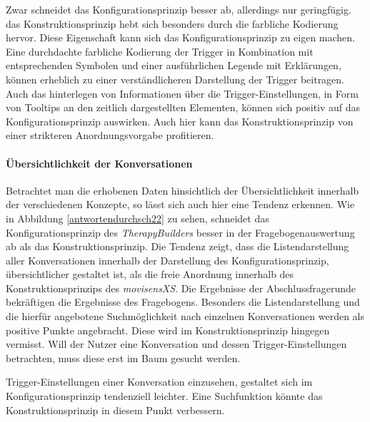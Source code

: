 Zwar schneidet das Konfigurationsprinzip besser ab, allerdings nur geringfügig. das Konstruktionsprinzip hebt sich besonders durch die farbliche Kodierung hervor. Diese Eigenschaft kann sich das Konfigurationsprinzip zu eigen machen. Eine durchdachte farbliche Kodierung der Trigger in Kombination mit entsprechenden Symbolen und einer ausführlichen Legende mit Erklärungen, können erheblich zu einer verständlicheren Darstellung der Trigger beitragen. Auch das hinterlegen von Informationen über die Trigger-Einstellungen, in Form von Tooltips an den zeitlich dargestellten Elementen, können sich positiv auf das Konfigurationsprinzip auswirken. Auch hier kann das Konstruktionsprinzip von einer strikteren Anordnungsvorgabe profitieren. 

\paragraph{Übersichtlichkeit der Konversationen}
Betrachtet man die erhobenen Daten hinsichtlich der Übersichtlichkeit innerhalb der verschiedenen Konzepte, so lässt sich auch hier eine Tendenz erkennen. Wie in Abbildung \ref{antwortendurchsch22} zu sehen, schneidet das Konfigurationsprinzip des \emph{TherapyBuilders} besser in der Fragebogenauswertung ab als das Konstruktionsprinzip. Die Tendenz zeigt, dass die Listendarstellung aller Konversationen innerhalb der Darstellung des Konfigurationsprinzip, übersichtlicher gestaltet ist, als die freie Anordnung innerhalb des Konstruktionsprinzips des \emph{movisensXS}. Die Ergebnisse der Abschlussfragerunde bekräftigen die Ergebnisse des Fragebogens. Besonders die Listendarstellung und die hierfür angebotene Suchmöglichkeit nach einzelnen Konversationen werden als positive Punkte angebracht. Diese wird im Konstruktionsprinzip hingegen vermisst. Will der Nutzer eine Konversation und dessen Trigger-Einstellungen betrachten, muss diese erst im Baum gesucht werden. 

Trigger-Einstellungen einer Konversation einzusehen, gestaltet sich im Konfigurationsprinzip tendenziell leichter. Eine Suchfunktion könnte das Konstruktionsprinzip in diesem Punkt verbessern.


